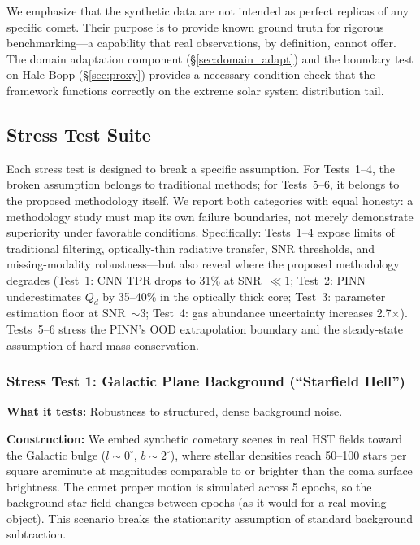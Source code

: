 \documentclass[usenatbib]{mnras}
\begin{document}
We emphasize that the synthetic data are not intended as perfect replicas of any specific comet. Their purpose is to provide known ground truth for rigorous benchmarking---a capability that real observations, by definition, cannot offer. The domain adaptation component (\S\ref{sec:domain_adapt}) and the boundary test on Hale-Bopp (\S\ref{sec:proxy}) provides a necessary-condition check that the framework functions correctly on the extreme solar system distribution tail.

\subsection{Stress Test Suite}\label{sec:stress}

Each stress test is designed to break a specific assumption. For Tests~1--4, the broken assumption belongs to traditional methods; for Tests~5--6, it belongs to the proposed methodology itself. We report both categories with equal honesty: a methodology study must map its own failure boundaries, not merely demonstrate superiority under favorable conditions. Specifically: Tests~1--4 expose limits of traditional filtering, optically-thin radiative transfer, SNR thresholds, and missing-modality robustness---but also reveal where the proposed methodology degrades (Test~1: CNN TPR drops to 31\% at SNR~$\ll 1$; Test~2: PINN underestimates $Q_d$ by 35--40\% in the optically thick core; Test~3: parameter estimation floor at SNR~$\sim$3; Test~4: gas abundance uncertainty increases 2.7$\times$). Tests~5--6 stress the PINN's OOD extrapolation boundary and the steady-state assumption of hard mass conservation.

\subsubsection{Stress Test 1: Galactic Plane Background (``Starfield Hell'')}

\textbf{What it tests:} Robustness to structured, dense background noise.

\textbf{Construction:} We embed synthetic cometary scenes in real HST fields toward the Galactic bulge ($l \sim 0^\circ$, $b \sim 2^\circ$), where stellar densities reach 50--100 stars per square arcminute at magnitudes comparable to or brighter than the coma surface brightness. The comet proper motion is simulated across 5 epochs, so the background star field changes between epochs (as it would for a real moving object). This scenario breaks the stationarity assumption of standard background subtraction.
\end{document}
